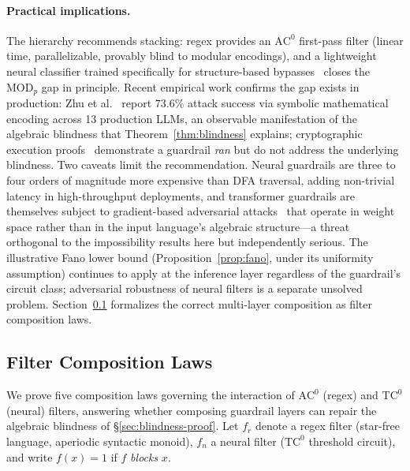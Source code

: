 \documentclass[letterpaper,twocolumn,10pt]{article}
\theoremstyle{definition}
\theoremstyle{remark}
\begin{document}
\paragraph{Practical implications.}
The hierarchy recommends stacking: regex provides an $\mathrm{AC}^0$
first-pass filter (linear time, parallelizable, provably blind to modular
encodings), and a lightweight neural classifier trained specifically for
structure-based bypasses~\cite{strobl2024formal,merrill2024survey} closes
the $\mathrm{MOD}_p$ gap in principle.
Recent empirical work confirms the gap exists in production: Zhu et
al.~\cite{mathprompt2024} report $73.6\%$ attack success via symbolic
mathematical encoding across 13 production LLMs, an observable
manifestation of the algebraic blindness that Theorem~\ref{thm:blindness}
explains; cryptographic execution
proofs~\cite{proofofguardrail2026} demonstrate a guardrail \emph{ran} but
do not address the underlying blindness.
Two caveats limit the recommendation.
Neural guardrails are three to four orders of magnitude more expensive
than DFA traversal, adding non-trivial latency in high-throughput
deployments, and transformer guardrails are themselves subject to
gradient-based adversarial attacks~\cite{zou2023universal} that operate in
weight space rather than in the input language's algebraic structure---a
threat orthogonal to the impossibility results here but independently
serious.
The illustrative Fano lower bound (Proposition~\ref{prop:fano}, under its
uniformity assumption) continues to apply at the inference layer
regardless of the guardrail's circuit class; adversarial robustness of
neural filters is a separate unsolved problem.
Section~\ref{sec:filter-composition} formalizes the correct multi-layer
composition as filter composition laws.

\subsection{Filter Composition Laws}\label{sec:filter-composition}

We prove five composition laws governing the interaction of
$\mathrm{AC}^0$ (regex) and $\mathrm{TC}^0$ (neural) filters, answering
whether composing guardrail layers can repair the algebraic blindness of
\S\ref{sec:blindness-proof}.
Let $f_r$ denote a regex filter (star-free language, aperiodic syntactic
monoid), $f_n$ a neural filter ($\mathrm{TC}^0$ threshold circuit), and
write $f(x) = 1$ if $f$ \emph{blocks} $x$.
\end{document}
